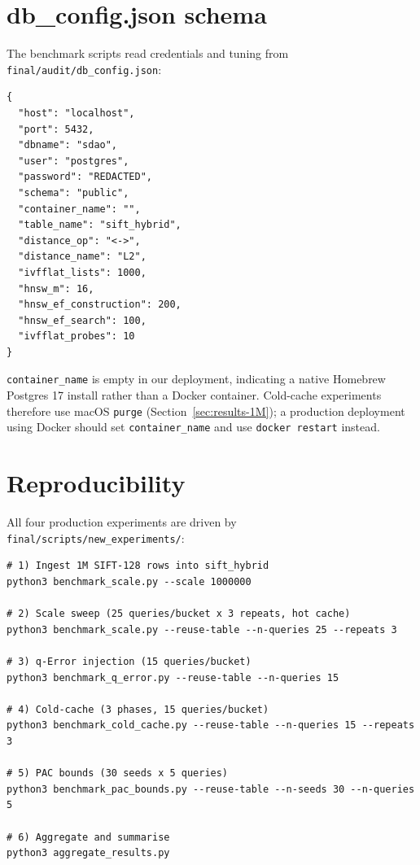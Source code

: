 \documentclass[conference]{IEEEtran}
\begin{document}
\appendix
\section{db\_config.json schema}
\label{app:config}
The benchmark scripts read credentials and tuning from
\texttt{final/audit/db\_config.json}:

\begingroup\footnotesize
\begin{verbatim}
{
  "host": "localhost",
  "port": 5432,
  "dbname": "sdao",
  "user": "postgres",
  "password": "REDACTED",
  "schema": "public",
  "container_name": "",
  "table_name": "sift_hybrid",
  "distance_op": "<->",
  "distance_name": "L2",
  "ivfflat_lists": 1000,
  "hnsw_m": 16,
  "hnsw_ef_construction": 200,
  "hnsw_ef_search": 100,
  "ivfflat_probes": 10
}
\end{verbatim}
\endgroup

\texttt{container\_name} is empty in our deployment, indicating
a native Homebrew Postgres 17 install rather than a Docker
container.  Cold-cache experiments therefore use macOS
\texttt{purge} (Section~\ref{sec:results-1M}); a production
deployment using Docker should set
\texttt{container\_name} and use \texttt{docker restart} instead.

\section{Reproducibility}
\label{app:repro}
All four production experiments are driven by
\texttt{final/scripts/new\_experiments/}:

\begingroup\footnotesize
\begin{verbatim}
# 1) Ingest 1M SIFT-128 rows into sift_hybrid
python3 benchmark_scale.py --scale 1000000

# 2) Scale sweep (25 queries/bucket x 3 repeats, hot cache)
python3 benchmark_scale.py --reuse-table --n-queries 25 --repeats 3

# 3) q-Error injection (15 queries/bucket)
python3 benchmark_q_error.py --reuse-table --n-queries 15

# 4) Cold-cache (3 phases, 15 queries/bucket)
python3 benchmark_cold_cache.py --reuse-table --n-queries 15 --repeats 3

# 5) PAC bounds (30 seeds x 5 queries)
python3 benchmark_pac_bounds.py --reuse-table --n-seeds 30 --n-queries 5

# 6) Aggregate and summarise
python3 aggregate_results.py
\end{verbatim}
\endgroup
\end{document}

